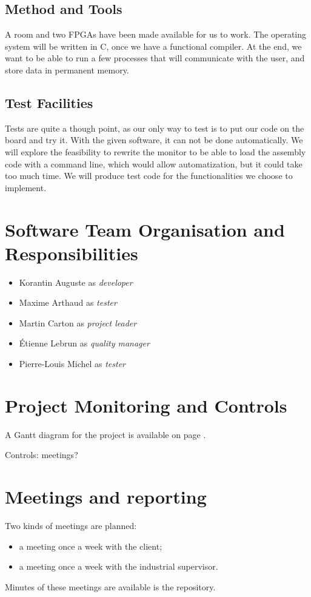 \documentclass{article}
\begin{document}
    \subsection{Method and Tools}
    A room and two FPGAs have been made available for us to work.
    The operating system will be written in C, once we have a functional
    compiler.
    At the end, we want to be able to run a few processes that will communicate
    with the user, and store data in permanent memory.

     \subsection{Test Facilities}
    Tests are quite a though point, as our only way to test is to put
    our code on the board and try it. With the given software, it can not be
    done automatically.
    We will explore the feasibility to rewrite the monitor to be able to load
    the assembly code with a command line, which would allow automatization, but
    it could take too much time.
    We will produce test code for the functionalities we choose to implement.

  \section{Software Team Organisation and Responsibilities}
    \begin{itemize}
      \item Korantin Auguste as \textit{developer}
      \item Maxime Arthaud as \textit{tester}
      \item Martin Carton as \textit{project leader}
      \item Étienne Lebrun as \textit{quality manager}
      \item Pierre-Louis Michel as \textit{tester}
    \end{itemize}

  \section{Project Monitoring and Controls}
    A Gantt diagram for the project is available on page \pageref{fig:gantt}.

    Controls: meetings?


  \section{Meetings and reporting}
    Two kinds of meetings are planned:
    \begin{itemize}
        \item a meeting once a week with the client;
        \item a meeting once a week with the industrial supervisor.
    \end{itemize}
    Minutes of these meetings are available is the repository.
\end{document}
